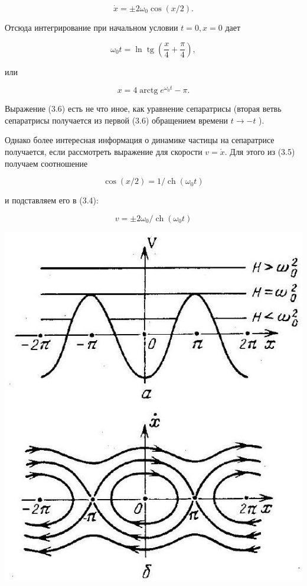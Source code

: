 \documentclass[10pt]{article}
\begin{document}
\begin{equation*}
\dot{x}= \pm 2 \omega_{0} \cos (x / 2) . \tag{3.4}
\end{equation*}


Отсюда интегрирование при начальном условии $t=0, x=0$ дает


\begin{equation*}
\omega_{0} t=\ln \operatorname{tg}\left(\frac{x}{4}+\frac{\pi}{4}\right), \tag{3.5}
\end{equation*}


или


\begin{equation*}
x=4 \operatorname{arctg} e^{\omega_{0} t}-\pi . \tag{3.6}
\end{equation*}


Выражение (3.6) есть не что иное, как уравнение сепаратрисы (вторая ветвь сепаратрисы получается из первой (3.6) обращением времени $t \rightarrow-t$ ).

Однако более интересная информация о динамике частицы на сепаратрисе получается, если рассмотреть выражение для скорости $v=\dot{x}$. Для этого из (3.5) получаем соотношение

$$
\cos (x / 2)=1 / \operatorname{ch}\left(\omega_{0} t\right)
$$

и подставляем его в (3.4):


\begin{equation*}
v= \pm 2 \omega_{0} / \operatorname{ch}\left(\omega_{0} t\right) \tag{3.7}
\end{equation*}


\begin{center}
\includegraphics[max width=\textwidth]{2024_12_13_2abbd56e24043f80c30dg-2(1)}
\end{center}
\end{document}
